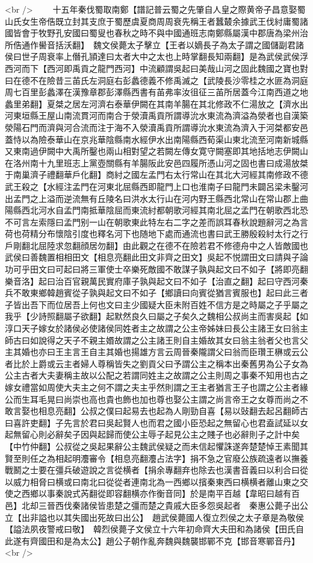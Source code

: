 <br />
　　十五年秦伐蜀取南鄭【譜記普云蜀之先肇自人皇之際黄帝子昌意娶蜀山氏女生帝俈既立封其支庶于蜀歷虞夏商周周衰先稱王者蠶樷余據武王伐紂庸蜀諸國皆會于牧野孔安國曰蜀叟也春秋之時不與中國通班志南鄭縣屬漢中郡唐為梁州治所俈通作嚳音括沃翻】　魏文侯薨太子擊立【王者以嫡長子為太子謂之國儲副君諸侯曰世子周衰率上僭孔頴達曰太者大中之太也上時掌翻長知兩翻】是為武侯武侯浮西河而下【西河即禹貢之龍門西河】中流顧謂吳起曰美哉山河之固此魏國之寶也對曰在德不在險昔三苖氏左洞庭右彭蠡德義不修禹滅之【武陵長沙零桂之水匪為洞庭周七百里彭蠡澤在漢豫章郡彭澤縣西書有苖弗率汝徂征三苖所居蓋今江南西道之地蠡里弟翻】夏桀之居左河濟右泰華伊闕在其南羊腸在其北修政不仁湯放之【濟水出河東垣縣王屋山南流貫河而南合于滎瀆禹貢所謂導沇水東流為濟溢為滎者也自漢築滎陽石門而濟與河合流而注于海不入滎瀆禹貢所謂導沇水東流為濟入于河桀都安邑蓋恃以為險泰華山在京兆華陰縣南水經伊水出南陽縣西荀渠山東北流至河南新城縣又東南過伊闕中大禹所鑿也兩山相對望之若闕左傳女寛守闕塞即其地括地志伊闕山在洛州南十九里班志上黨壺關縣有羊腸阪此安邑四履所憑山河之固也書曰成湯放桀于南巢濟子禮翻華戶化翻】商紂之國左孟門右太行常山在其北大河經其南修政不德武王殺之【水經注孟門在河東北屈縣西即龍門上口也淮南子曰龍門未闢呂梁未鑿河出孟門之上溢而逆流無有丘陵名曰洪水太行山在河内野王縣西北常山在常山郡上曲陽縣西北河水自孟門南抵華陰屈而東流紂都朝歌河經其南北屈之孟門在朝歌西北恐不可言左索隱曰孟門别一山在朝歌東此特左右二字之差而誤耳春秋說題辭河之為言荷也荷精分布懷陰引度也釋名河下也随地下處而通流也書曰武王勝殷殺紂太行之行戶剛翻北屈陸求忽翻顔居勿翻】由此觀之在德不在險若君不修德舟中之人皆敵國也武侯曰善魏置相相田文【相息亮翻此田文非齊之田文】吳起不悦謂田文曰請與子論功可乎田文曰可起曰將三軍使士卒樂死敵國不敢謀子孰與起文曰不如子【將即亮翻樂音洛】起曰治百官親萬民實府庫子孰與起文曰不如子【治直之翻】起曰守西河秦兵不敢東鄉韓趙賓從子孰與起文曰不如子【鄉讀曰向賓從猶言賓服也】起曰此三者子皆出吾下而位居吾上何也文曰主少國疑大臣未附百姓不信方是之時屬之子乎屬之我乎【少詩照翻屬子欲翻】起默然良久曰屬之子矣久之魏相公叔尚主而害吳起【如淳口天子嫁女於諸侯必使諸侯同姓者主之故謂之公主帝姊妹曰長公主諸王女曰翁主師古曰如說得之天子不親主㛰故謂之公主諸王則自主婚故其女曰翁主翁者父也言父主其婚也亦曰王主言王自主其婚也揚雄方言云周晉秦隴謂父曰翁而臣瓚王楙或云公者比於上爵或云主者婦人尊稱皆失之劉貢父曰予謂公主之稱本出秦舊男為公子女為公主古者大夫妻稱主故以公配之若謂同姓主之故謂之公主則周之事秦不知用也古之嫁女禮當如周使大夫主之何不謂之夫主乎然則謂之王主者猶言王子也謂之公主者緣公而生耳毛晃曰尚崇也高也貴也飾也加也尊也娶公主謂之尚言帝王之女尊而尚之不敢言娶也相息亮翻】公叔之僕曰起易去也起為人剛勁自喜【易以䜴翻去起呂翻師古曰喜許吏翻】子先言於君曰吳起賢人也而君之國小臣恐起之無留心也君盍試延以女起無留心則必辭矣子因與起歸而使公主辱子起見公主之賤子也必辭則子之計中矣【中竹仲翻】公叔從之吳起果辭公主魏武侯疑之而未信起懼誅遂奔楚楚悼王素聞其賢至則任之為相起明灋審令【相息亮翻灋占法字】捐不急之官廢公族疏遠者以撫養戰鬭之士要在彊兵破遊說之言從横者【捐余專翻弃也除去也漢書音義曰以利合曰從以威力相脅曰横或曰南北曰從從者連南北為一西鄉以擯秦東西曰横横者離山東之交使之西鄉以事秦說式芮翻從即容翻横亦作衡音同】於是南平百越【韋昭曰越有百邑】北却三晉西伐秦諸侯皆患楚之彊而楚之貴戚大臣多怨吳起者　秦惠公薨子出公立【出非謚也以其失國出死故曰出公】　趙武侯薨國人復立烈侯之太子章是為敬侯【謚法夙夜警戒曰敬】　韓烈侯薨子文侯立十六年初命齊大夫田和為諸侯【田氏自此遂有齊國田和是為太公】趙公子朝作亂奔魏與魏襲邯鄲不克【邯音寒鄲音丹】<br />
